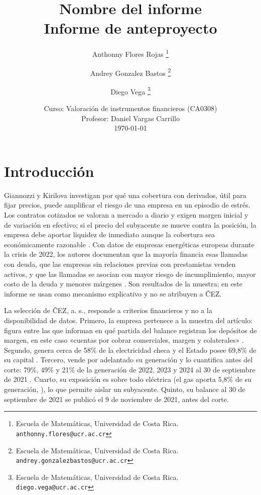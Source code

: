\documentclass[11pt,letterpaper]{article}
\title{
    \textbf{Nombre del informe}\\[0.4em]
    \large Informe de anteproyecto
}
\author{%
    {Anthonny Flores Rojas}
    \thanks{
        Escuela de Matemáticas,
        Universidad de Costa Rica.
        \texttt{anthonny.flores@ucr.ac.cr}
    }
    \and
    {Andrey Gonzalez Bastos}
    \thanks{
        Escuela de Matemáticas,
        Universidad de Costa Rica.
        \texttt{andrey.gonzalezbastos@ucr.ac.cr}
    }
    \and
    {Diego Vega}
    \thanks{
        Escuela de Matemáticas,
        Universidad de Costa Rica.
        \texttt{diego.vega@ucr.ac.cr}
    }
}
\date{
    Curso: Valoración de instrumentos financieros (CA0308)\\
    Profesor: Daniel Vargas Carrillo\\[0.3em]
    \today
}
\theoremstyle{plain}
\theoremstyle{definition}
\theoremstyle{remark}
\numberwithin{equation}{section}
\begin{document}
	
	
	\maketitle

	\newpage

	\tableofcontents   %

	\newpage
	
\section{Introducción}\label{sec:intro}

Giannozzi y Kirilova \parencite{GIANNOZZI2026107700} investigan por qué una cobertura 
con derivados, útil para fijar precios, puede amplificar el riesgo de una empresa en 
un episodio de estrés. Los contratos cotizados se valoran a mercado a diario y exigen
 margen inicial y de variación en efectivo; si el precio del subyacente se mueve contra 
 la posición, la empresa debe aportar liquidez de inmediato aunque la cobertura sea 
 económicamente razonable \parencite[p.~1]{GIANNOZZI2026107700}. Con datos de empresas 
 energéticas europeas durante la crisis de 2022, los autores documentan que la mayoría 
 financia esas llamadas con deuda, que las empresas sin relaciones previas con prestamistas 
 venden activos, y que las llamadas se asocian con mayor riesgo de incumplimiento, 
 mayor costo de la deuda y menores márgenes \parencite[p.~1]{GIANNOZZI2026107700}. 
 Son resultados de la muestra; en este informe se usan como mecanismo explicativo y 
 no se atribuyen a ČEZ.

La selección de ČEZ, a. s., responde a criterios financieros y no a 
la disponibilidad de datos. Primero, la empresa pertenece a la muestra del artículo: 
figura entre las que informan en qué partida del balance registran los depósitos de margen, 
en este caso «cuentas por cobrar comerciales, margen y colaterales» 
\parencite[Apéndice A3, p.~16]{GIANNOZZI2026107700}. Segundo, genera cerca de 58\% 
de la electricidad checa \parencite[p.~11]{cez_fs_2021} y el Estado posee 69,8\% de su 
capital \parencite[p.~10]{cez_interim_q3_2021}. Tercero, vende por adelantado su generación 
y lo cuantifica antes del corte: 79\%, 49\% y 21\% de la generación de 2022, 2023 y 
2024 al 30 de septiembre de 2021 \parencite[p.~27]{cez_interim_q3_2021}. 
Cuarto, su exposición es sobre todo eléctrica (el gas aporta 5,8\% de su generación, 
\parencite{cez_story_2022}), lo que permite aislar un subyacente. 
Quinto, su balance al 30 de septiembre de 2021 se publicó el 9 de noviembre de 2021, 
antes del corte.
\end{document}
